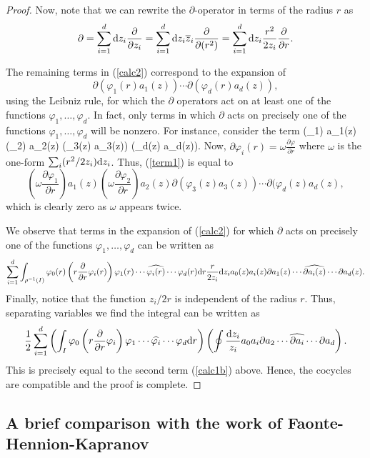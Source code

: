 \begin{proof}
Now, note that we can rewrite the $\partial$-operator in terms of the radius $r$ as
\begin{align*}
\partial = \sum_{i=1}^d {\rm d} z_i \frac{\partial}{\partial z_i} = \sum_{i=1}^d {\rm d} z_i \overline{z}_i \frac{\partial}{\partial (r^2)} = \sum_{i=1}^d {\rm d} z_i \frac{r^2}{2 z_i} \frac{\partial}{\partial r} .
\end{align*}

The remaining terms in (\ref{calc2}) correspond to the expansion of
\[
\partial(\varphi_1(r) a_1(z)) \cdots \partial(\varphi_d(r) a_d(z)),
\]
using the Leibniz rule, for which the $\partial$ operators act on at least one of the functions $\varphi_1,\ldots,\varphi_d$. In fact, only terms in which $\partial$ acts on precisely one of the functions $\varphi_1,\ldots, \varphi_d$ will be nonzero. For instance, consider the term
\beqn\label{term1}
(\partial \varphi_1) a_1(z) (\partial \varphi_2) a_2(z) \partial(\varphi_3(z) a_3(z)) \cdots \partial(\varphi_d(z) a_d(z)).
\eeqn
Now, $\partial \varphi_i(r) = \omega \frac{\partial \varphi}{\partial r}$ where $\omega$ is the one-form $\sum_i (r^2 / 2 z_i) {\rm d} z_i$. Thus, (\ref{term1}) is equal to
\[
\left(\omega \frac{\partial \varphi_1}{\partial r} \right) a_1(z) \left(\omega \frac{\partial \varphi_2}{\partial r}  \right) a_2(z) \partial(\varphi_3(z) a_3(z)) \cdots \partial(\varphi_d(z) a_d(z),
\]
which is clearly zero as $\omega$ appears twice.

We observe that terms in the expansion of (\ref{calc2}) for which $\partial$ acts on precisely one of the functions $\varphi_1,\ldots,\varphi_d$ can be written as
\[
\sum_{i=1}^d \int_{\rho^{-1}(I)} \varphi_0(r)\left(r \frac{\partial}{\partial r} \varphi_i(r)\right) \varphi_1(r) \cdots \widehat{\varphi_i(r)} \cdots \varphi_d(r) {\rm d} r \frac{r}{2 z_i} {\rm d} z_i a_0(z) a_i(z) \partial a_1(z) \cdots \widehat{\partial a_i(z)} \cdots \partial a_d(z) .
\] 
Finally, notice that the function $z_i / 2r$ is independent of the radius $r$. Thus, separating variables we find the integral can be written as
\[
\frac{1}{2} \sum_{i=1}^d \left(\int_{I} \varphi_0 \left(r \frac{\partial}{\partial r} \varphi_i \right) \varphi_1 \cdots \widehat{\varphi_i } \cdots \varphi_d {\rm d} r\right) \left(\oint \frac{{\rm d} z_i}{z_i} a_0 a_i \partial a_2 \cdots \widehat{\partial a_i} \cdots \partial a_d \right) .
\]
This is precisely equal to the second term (\ref{calc1b}) above. Hence, the cocycles are compatible and the proof is complete. 
\end{proof}

\subsection{A brief comparison with the work of Faonte-Hennion-Kapranov}

